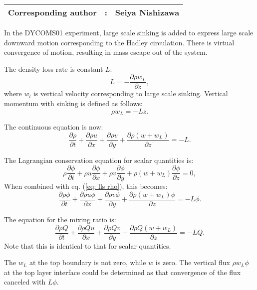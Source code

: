 {\bf \Large 
\begin{tabular}{ccc}
\hline
  Corresponding author & : & Seiya Nishizawa\\
\hline
\end{tabular}
}


In the DYCOMS01 experiment, large scale sinking is added to express large scale downward motion corresponding to the Hadley circulation. There is virtual convergence of motion, resulting in mass escape out of the system.

The density loss rate is constant $L$:
\begin{equation}
  L = -\frac{\partial \rho w_L}{\partial z},
\end{equation}
where $w_l$ is vertical velocity corresponding to large scale sinking.
Vertical momentum with sinking is defined as follows:
\begin{equation}
  \rho w_L = -Lz.
\end{equation}

The continuous equation is now:
\begin{equation}
  \frac{\partial \rho}{\partial t}
  + \frac{\partial \rho u}{\partial x}
  + \frac{\partial \rho v}{\partial y}
  + \frac{\partial \rho (w+w_L)}{\partial z}
  = -L.
  \label{eq: lls rho}
\end{equation}

The Lagrangian conservation equation for scalar quantities is:
\begin{equation}
  \rho\frac{\partial \phi}{\partial t}
  + \rho u\frac{\partial \phi}{\partial x}
  + \rho v\frac{\partial \phi}{\partial y}
  + \rho (w+w_L)\frac{\partial \phi}{\partial z}
  = 0,
\end{equation}
When combined with eq. (\ref{eq: lls rho}), this becomes:
\begin{equation}
  \frac{\partial \rho\phi}{\partial t}
  + \frac{\partial \rho u \phi}{\partial x}
  + \frac{\partial \rho v \phi}{\partial y}
  + \frac{\partial \rho (w+w_L) \phi}{\partial z}
  = -L\phi.
\end{equation}

The equation for the mixing ratio is:
\begin{equation}
  \frac{\partial \rho Q}{\partial t}
  + \frac{\partial \rho Q u }{\partial x}
  + \frac{\partial \rho Q v}{\partial y}
  + \frac{\partial \rho Q (w+w_L)}{\partial z}
  = -L Q.
\end{equation}
Note that this is identical to that for scalar quantities.

The $w_L$ at the top boundary is not zero, while $w$ is zero.
The vertical flux $\rho w_L \phi$ at the top layer interface could be determined as that convergence of the flux canceled with $L\phi$.



